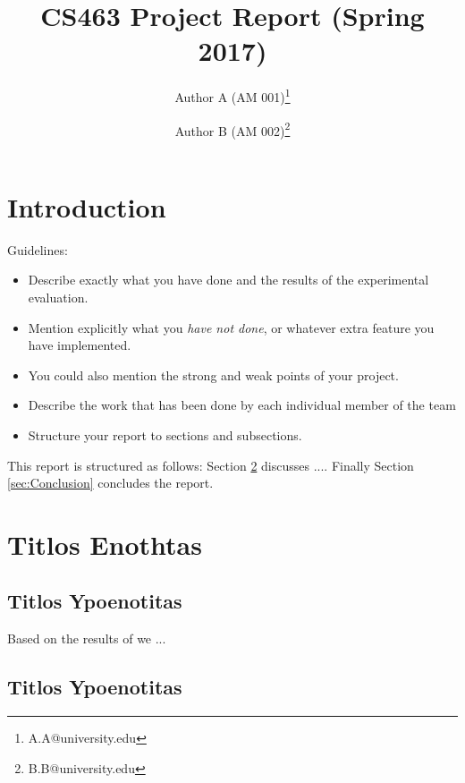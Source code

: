 \documentclass{article}
\begin{document}
\title{CS463 Project Report (Spring 2017)}

\author[1]{Author A (AM 001)\thanks{A.A@university.edu}}
\author[2]{Author B (AM 002)\thanks{B.B@university.edu}}



\maketitle



\section{Introduction}


Guidelines:
\begin{itemize}
 \item Describe exactly what you have done  and the results of the experimental evaluation.
\item  Mention explicitly what you {\em have not done}, or whatever extra feature you have implemented.
\item  You could also mention the strong and weak points of your project.
\item  Describe the work that has been done by each individual  member of the team
\item  Structure your report to sections and subsections.
\end{itemize}




This report is structured as follows:
Section \ref{sec:E} discusses ....
Finally
Section \ref{sec:Conclusion} concludes the report.


\section{Titlos Enothtas}
\label{sec:E}

\subsection{Titlos Ypoenotitas}


Based on the results of \cite{Rochio} we ...


\subsection{Titlos Ypoenotitas}
\end{document}
